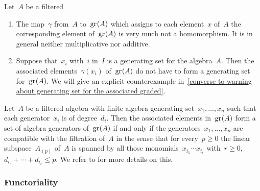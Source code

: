 \begin{warning}
  \label{generators of associated graded}
  Let~$A$ be a filtered~{\algebra{$\kf$}}
  \begin{enumerate}
    \item
      The map~$\gamma$ from~$A$ to~$\gr(A)$ which assigns to each element~$x$ of~$A$ the corresponding element of~$\gr(A)$ is very much not a homomorphism.
      It is in general neither multiplicative nor additive.
    \item
      \label{generators of associated graded part}
      Suppose that~$x_i$ with~$i$ in~$I$ is a generating set for the algebra~$A$.
      Then the associated elements~$\gamma(x_i)$ of~$\gr(A)$ do not have to form a generating set for~$\gr(A)$.
      We will give an explicit counterexample in~\cref{converse to warning about generating set for the associated graded}.
  \end{enumerate}
\end{warning}


\begin{remark}
  Let~$A$ be a filtered algebra with finite algebra generating set~$x_1, \dotsc, x_n$ such that each generator~$x_i$ is of degree~$d_i$.
  Then the associated elements in~$\gr(A)$ form a set of algebra generators of~$\gr(A)$ if and only if the generators~$x_1, \dotsc, x_n$ are compatible with the filtration of~$A$ in the sense that for every~$p \geq 0$ the linear subspace~$A_{(p)}$ of~$A$ is spanned by all those monomials~$x_{i_1} \dotsm x_{i_r}$ with~$r \geq 0$,~$d_{i_r} + \dotsb + d_{i_r} \leq p$.
  We refer to \cite{associated_generated} for more details on this.
\end{remark}

\subsubsection{Functoriality}

